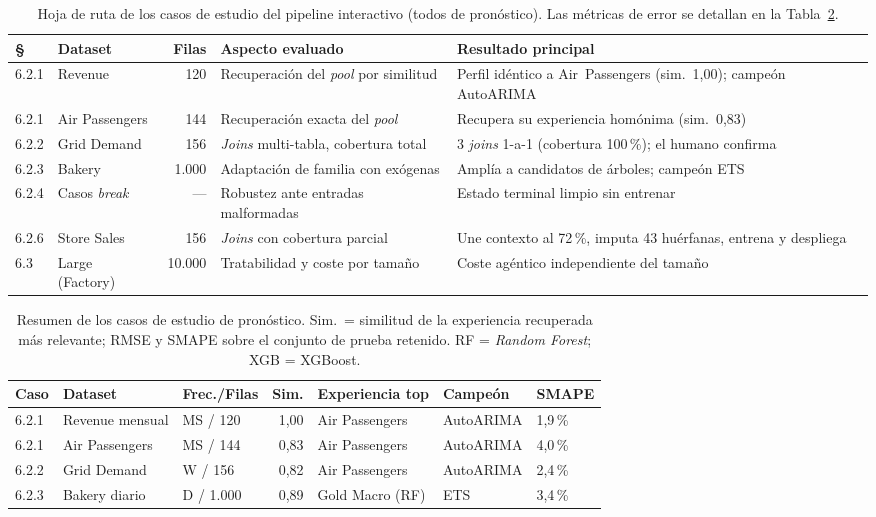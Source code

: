 \begin{table}[H]
\centering
\caption{Hoja de ruta de los casos de estudio del pipeline interactivo (todos de
 pronóstico). Las métricas de error se detallan en la Tabla~\ref{tab:casos-resumen}.}
\label{tab:casos-roadmap}
\small
\setlength{\tabcolsep}{4pt}
\begin{tabular}{llrp{3.9cm}p{4.6cm}}
\toprule
\textbf{\S} & \textbf{Dataset} & \textbf{Filas} & \textbf{Aspecto evaluado} & \textbf{Resultado principal} \\
\midrule
6.2.1 & Revenue        & 120    & Recuperación del \textit{pool} por similitud & Perfil idéntico a Air~Passengers (sim.\ 1,00); campeón AutoARIMA \\
6.2.1 & Air Passengers & 144    & Recuperación exacta del \textit{pool}        & Recupera su experiencia homónima (sim.\ 0,83) \\
6.2.2 & Grid Demand    & 156    & \textit{Joins} multi-tabla, cobertura total  & 3 \textit{joins} 1-a-1 (cobertura 100\,\%); el humano confirma \\
6.2.3 & Bakery         & 1.000  & Adaptación de familia con exógenas           & Amplía a candidatos de árboles; campeón ETS \\
6.2.4 & Casos \textit{break} & --- & Robustez ante entradas malformadas          & Estado terminal limpio sin entrenar \\
6.2.6 & Store Sales         & 156    & \textit{Joins} con cobertura parcial         & Une contexto al 72\,\%, imputa 43 huérfanas, entrena y despliega \\
6.3   & Large (Factory)& 10.000 & Tratabilidad y coste por tamaño              & Coste agéntico independiente del tamaño \\
\bottomrule
\end{tabular}
\end{table}

\begin{table}[H]
\centering
\caption{Resumen de los casos de estudio de pronóstico.
 Sim.\ = similitud de la experiencia recuperada más relevante;
 RMSE y SMAPE sobre el conjunto de prueba retenido.
 RF = \textit{Random Forest}; XGB = XGBoost.}
\label{tab:casos-resumen}
\small
\setlength{\tabcolsep}{4pt}
\begin{tabular}{lllrlll}
\toprule
\textbf{Caso} & \textbf{Dataset} & \textbf{Frec./Filas}
  & \textbf{Sim.} & \textbf{Experiencia top}
  & \textbf{Campeón} & \textbf{SMAPE} \\
\midrule
6.2.1 & Revenue mensual    & MS / 120 & 1,00 & Air Passengers      & AutoARIMA & 1,9\,\% \\
6.2.1 & Air Passengers     & MS / 144 & 0,83 & Air Passengers      & AutoARIMA & 4,0\,\% \\
6.2.2 & Grid Demand        & W / 156  & 0,82 & Air Passengers      & AutoARIMA & 2,4\,\% \\
6.2.3 & Bakery diario      & D / 1.000& 0,89 & Gold Macro (RF)     & ETS       & 3,4\,\% \\
\bottomrule
\end{tabular}
\end{table}

